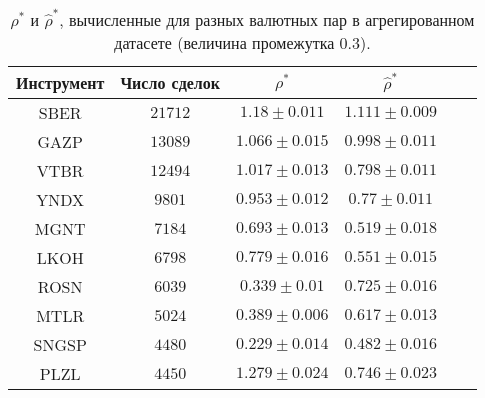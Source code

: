 \begin{table}[h!]
    \begin{center}
        \begin{tabular}{|c|c|c|c|c|c|}
            \hline
            Инструмент & Число сделок & $\rho^*$ & $\hat \rho^*$           \\ \hline
            SBER & $21712$ & $1.18 \pm 0.011$ & $1.111 \pm 0.009$ \\ \hline
            GAZP       & $13089$      & $1.066 \pm 0.015$ & $0.998 \pm 0.011$ \\ \hline
            VTBR       & $12494$      & $1.017 \pm 0.013$ & $0.798 \pm 0.011$ \\ \hline
            YNDX       & $9801$       & $0.953 \pm 0.012$ & $0.77 \pm 0.011$  \\ \hline
            MGNT       & $7184$       & $0.693 \pm 0.013$ & $0.519 \pm 0.018$ \\ \hline
            LKOH       & $6798$       & $0.779 \pm 0.016$ & $0.551 \pm 0.015$ \\ \hline
            ROSN       & $6039$       & $0.339 \pm 0.01$  & $0.725 \pm 0.016$ \\ \hline
            MTLR       & $5024$       & $0.389 \pm 0.006$ & $0.617 \pm 0.013$ \\ \hline
            SNGSP      & $4480$       & $0.229 \pm 0.014$ & $0.482 \pm 0.016$ \\ \hline
            PLZL       & $4450$       & $1.279 \pm 0.024$ & $0.746 \pm 0.023$ \\ \hline
        \end{tabular}
    \end{center}\caption{$\rho^*$ и $\hat \rho^*$, вычисленные для разных валютных пар в агрегированном датасете (величина промежутка 0.3).}
    \label{Aggreg1CU0.3} \end{table}

